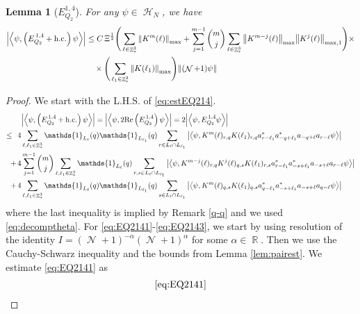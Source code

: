 \documentclass[sn-mathphys, Numbered ,a4paper]{sn-jnl}%
\DeclareMathOperator{\R}{\mathbb{R}}
\DeclareMathOperator{\Z}{\mathbb{Z}}
\DeclareMathOperator{\HH}{\mathcal{H}}
\DeclareMathOperator{\NN}{\mathcal{N}}
\newcommand{\half}{\frac{1}{2}}
\newcommand{\eva}[1]{\left\langle #1 \right\rangle}
\theoremstyle{plain}
\newtheorem{lemma}[theorem]{Lemma}
\theoremstyle{definition}
\theoremstyle{remark}
\theoremstyle{plain}
\theoremstyle{definition}
\theoremstyle{remark}
\begin{document}
\begin{lemma}[$E_{Q_2}^{1,4}$]
	For any $\psi \in \HH_N$, we have
	\begin{align}
		\abs{\eva{\psi,\left(E^{\,1,4}_{Q_2}+\mathrm{h.c.}\right) \psi }}
		&\leq  C\, \Xi^{\half} \Bigg(\sum\limits_{\ell \in \Z^3_*} \norm{K^m(\ell)}_{\mathrm{max}} + \sum\limits_{j=1}^{m-1} {m \choose j}\sum\limits_{\ell \in \Z^3_*}\norm{K^{m-j}(\ell)}_{\mathrm{max}}\norm{K^{j}(\ell)}_{\mathrm{max,1}}\Bigg)\times\nonumber\\&\quad\times \Bigg( \sum\limits_{\ell_1 \in \Z^3_*}\norm{K(\ell_1)}_{\mathrm{max}} \Bigg)  \norm { (\NN+1) \psi }   \label{eq:estEQ214}
	\end{align}
\end{lemma}
\begin{proof}
	We start with the L.H.S. of \eqref{eq:estEQ214}.
	\begin{align}
		&\abs{\eva{\psi,\left(E^{\,1,4}_{Q_2}+\mathrm{h.c.}\right) \psi }} = \abs{\eva{\psi,2\mathrm{Re}\left(E^{\,1,4}_{Q_2}\right) \psi }} = 2\abs{\eva{\psi, E^{\,1,4}_{Q_2} \psi }}\nonumber\\
		\leq\,\;4& \sum\limits_{\ell, \ell_1\in \Z^3_*} \mathds{1}_{L_{\ell}}(q) \mathds{1}_{L_{\ell_1}}(q) \sum\limits_{r\in L_{\ell} \cap L_{\ell_1}} \abs{\eva{\psi,  K^m(\ell)_{r,q}K(\ell_1)_{r,q}a^*_{r-\ell_1}a^*_{-q+\ell_1} a_{-q+\ell}a_{r-\ell} \psi }}\label{eq:EQ2141}\\
		+\,4& \sum\limits_{j=1}^{m-1} {{m}\choose j} \sum\limits_{\ell, \ell_1\in \Z^3_*}\mathds{1}_{L_{\ell}}(q) \sum\limits_{r,s \in L_{\ell} \cap L_{\ell_1}}  \abs{\eva{\psi, K^{m-j}(\ell)_{r,q} K^{j}(\ell)_{q,s} K(\ell_1)_{r,s} a^*_{r-\ell_1} a^*_{-s+\ell_1} a_{-s+\ell} a_{r-\ell} \psi }} \label{eq:EQ2142}\\
		+\,4&\sum\limits_{\ell, \ell_1\in \Z^3_*} \mathds{1}_{L_{\ell}}(q) \mathds{1}_{L_{\ell_1}}(q) \sum\limits_{s \in L_{\ell} \cap L_{\ell_1}} \abs{\eva{\psi,  K^m(\ell)_{q,s}K(\ell_1)_{q,s}a^*_{q-\ell_1}a^*_{-s+\ell_1} a_{-s+\ell}a_{q-\ell} \psi }}\label{eq:EQ2143}
	\end{align}
	where the last inequality is implied by Remark \ref{q-q} and we used \eqref{eq:decomptheta}.
	For \eqref{eq:EQ2141}-\eqref{eq:EQ2143}, we start by using resolution of the identity $I = (\NN+1)^{-\alpha}(\NN+1)^{\alpha}$ for some $\alpha \in \R$. Then we use the Cauchy-Schwarz inequality and the bounds from Lemma \ref{lem:pairest}.
	We estimate \eqref{eq:EQ2141} as 
	\begin{align}
		&\eqref{eq:EQ2141}\nonumber\\

\end{align}
\end{proof}
\end{document}

